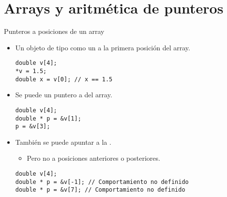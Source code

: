 \section{Arrays y aritmética de punteros}

\begin{frame}[t,fragile]{Punteros a posiciones de un array}
\begin{itemize}
  \item Un objeto de tipo   
        como un  a la primera posición del array.
\begin{lstlisting}
double v[4];
*v = 1.5;
double x = v[0]; // x == 1.5
\end{lstlisting}

  \item Se puede  un puntero a  del array.
\begin{lstlisting}
double v[4];
double * p = &v[1];
p = &v[3];
\end{lstlisting}

  \item También se puede apuntar a la .
    \begin{itemize}
      \item Pero no a posiciones anteriores o posteriores.
    \end{itemize}
\begin{lstlisting}
double v[4];
double * p = &v[-1]; // Comportamiento no definido
double * p = &v[7]; // Comportamiento no definido
\end{lstlisting}
\end{itemize}
\end{frame}

